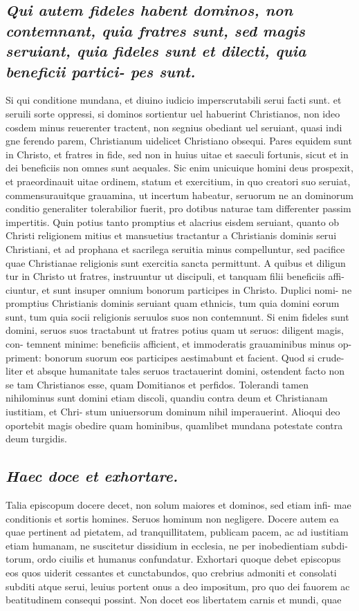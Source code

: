 \documentclass{article}
\begin{document}
\begin{pages}
\subsection*{\textit{Qui autem fideles habent dominos, non contemnant, quia fratres sunt, sed magis seruiant, quia fideles sunt et dilecti, quia beneficii partici- pes sunt. }}\pstart Si qui conditione mundana, et diuino iudicio imperscrutabili serui facti sunt. et seruili sorte oppressi, si dominos sortientur uel habuerint Christianos, non ideo cosdem minus reuerenter tractent, non segnius obediant uel seruiant, quasi indi gne ferendo parem, Christianum uidelicet Christiano obsequi. Pares equidem sunt in Christo, et fratres in fide, sed non in huius uitae et saeculi fortunis, sicut et in dei beneficiis non omnes sunt aequales. Sic enim unicuique homini deus prospexit, et praeordinauit uitae ordinem, statum et exercitium, in quo creatori suo seruiat, commensurauitque grauamina, ut incertum habeatur, seruorum ne an dominorum conditio generaliter tolerabilior fuerit, pro dotibus naturae tam differenter passim impertitis. Quin potius tanto promptius et alacrius eisdem seruiant, quanto ob Christi religionem mitius et mansuetius tractantur a Christianis dominis serui Christiani, et ad prophana et sacrilega seruitia minus compelluntur, sed pacifice quae Christianae religionis sunt exercitia sancta permittunt. A quibus et diligun tur in Christo ut fratres, instruuntur ut discipuli, et tanquam filii beneficiis affi- ciuntur, et sunt insuper omnium bonorum participes in Christo. Duplici nomi- ne promptius Christianis dominis seruiant quam ethnicis, tum quia domini eorum sunt, tum quia socii religionis seruulos suos non contemnunt. Si enim fideles sunt domini, seruos suos tractabunt ut fratres potius quam ut seruos: diligent magis, con- temnent minime: beneficiis afficient, et immoderatis grauaminibus minus op- priment: bonorum suorum eos participes aestimabunt et facient. Quod si crude- liter et absque humanitate tales seruos tractauerint domini, ostendent facto non se tam Christianos esse, quam Domitianos et perfidos. Tolerandi tamen nihilominus sunt domini etiam discoli, quandiu contra deum et Christianam iustitiam, et Chri- stum uniuersorum dominum nihil imperauerint. Alioqui deo oportebit magis obedire quam hominibus, quamlibet mundana potestate contra deum turgidis.  \pend
{}
{}
\subsection*{\textit{Haec doce et exhortare. }}\pstart Talia episcopum docere decet, non solum maiores et dominos, sed etiam infi- mae conditionis et sortis homines. Seruos hominum non negligere. Docere autem ea quae pertinent ad pietatem, ad tranquillitatem, publicam pacem, ac ad iustitiam etiam humanam, ne suscitetur dissidium in ecclesia, ne per inobedientiam subdi- torum, ordo ciuilis et humanus confundatur. Exhortari quoque debet episcopus eos quos uiderit cessantes et cunctabundos, quo crebrius admoniti et consolati subditi atque serui, leuius portent onus a deo impositum, pro quo dei fauorem ac beatitudinem consequi possint. Non docet eos libertatem carnis et mundi, quae  \pend

\end{pages}
\end{document}
